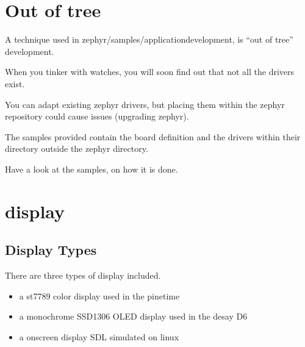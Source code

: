 \documentclass[letterpaper,10pt,english]{sphinxmanual}
\begin{document}


\chapter{Out of tree}
\label{\detokenize{out-of-tree:out-of-tree}}\label{\detokenize{out-of-tree::doc}}
A technique used in zephyr/samples/application\sphinxhyphen{}development, is “out of tree” development.

When you tinker with watches, you will soon find out that not all the drivers exist.

You can adapt existing zephyr drivers, but placing them within the zephyr repository could cause issues (upgrading zephyr).

The samples provided contain the board definition and the drivers within their directory outside the zephyr directory.

Have a look at the samples, on how it is done.

\begin{sphinxVerbatim}[commandchars=\\\{\}]
            
           
   
      
\end{sphinxVerbatim}


\chapter{display}
\label{\detokenize{display:display}}\label{\detokenize{display:display-sample}}\label{\detokenize{display::doc}}

\section{Display   Types}
\label{\detokenize{display:display-types}}
There are three types of display included.
\begin{itemize}
\item {} 
a st7789 color display used in the pinetime

\item {} 
a monochrome SSD1306 OLED display used in the desay D6

\item {} 
a on\sphinxhyphen{}screen display SDL simulated on linux

\end{itemize}
\end{document}
